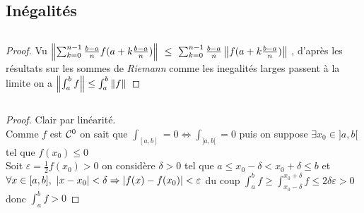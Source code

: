 \subsection{Inégalités}
    ${}$\\ 
    \begin{proof}
    Vu $\left\Vert \sum_{k=0}^{n-1} \frac{b-a}{n} f(a+k\frac{b-a}{n}) \right\Vert ~\leq ~\sum_{k=0}^{n-1} \frac{b-a}{n} \left\Vert f(a+k\frac{b-a}{n}) \right\Vert$ ,  
    d'après les résultats sur les sommes de \emph{Riemann} comme les inegalités larges passent à la limite on a 
    $\left\Vert \int_a^b f \right\Vert \leq \int_a^b \left\Vert f \right\Vert$
    \end{proof}
    ${}$ \\ 
    \begin{proof}
    \fbox{$\Rightarrow$} Clair par linéarité. \\ \fbox{$\Leftarrow$} Comme $f$ est ${\mathcal{C}}^0$ on sait que $\int_{[a,b]} =0 \Leftrightarrow 
    \int_{]a,b[} =0$ puis on suppose $\exists x_0 \in ]a,b[$ tel que $f(x_0) \leqslant 0$\\
    Soit $\varepsilon = \frac{1}{2} f(x_0) >0$ on considère $\delta >0$ tel que $a\leq x_0 -\delta < x_0+\delta \leq b$ et\\ $\forall 
    x\in [a,b],~\left\vert x-x_0 \right\vert < \delta \Rightarrow \left\vert f(x)-f(x_0) \right\vert <\varepsilon$ du coup $\int_a^b f \geqslant \int_{x_0-\delta}^{x_0+\delta} f \leq 
    2\delta\varepsilon >0$ donc $\int_a^b f >0$
    \end{proof}
    ${}$\\ 
